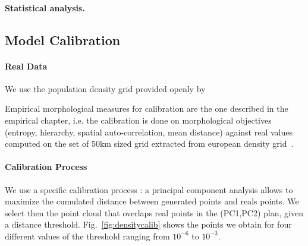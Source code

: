 \documentclass[10pt,letterpaper]{article}
\begin{document}
\paragraph{Statistical analysis.}



\subsection*{Model Calibration}

\paragraph{Real Data} We use the population density grid provided openly by 




Empirical morphological measures for calibration are the one described in the empirical chapter, i.e. the calibration is done on morphological objectives (entropy, hierarchy, spatial auto-correlation, mean distance) against real values computed on the set of 50km sized grid extracted from european density grid~\cite{eurostat}.





\paragraph{Calibration Process}

We use a specific calibration process : a principal component analysis allows to maximize the cumulated distance between generated points and reals points. We select then the point cloud that overlaps real points in the (PC1,PC2) plan, given a distance threshold. Fig.~\ref{fig:densitycalib} shows the points we obtain for four different values of the threshold ranging from $10^{-6}$ to $10^{-3}$.
\end{document}
